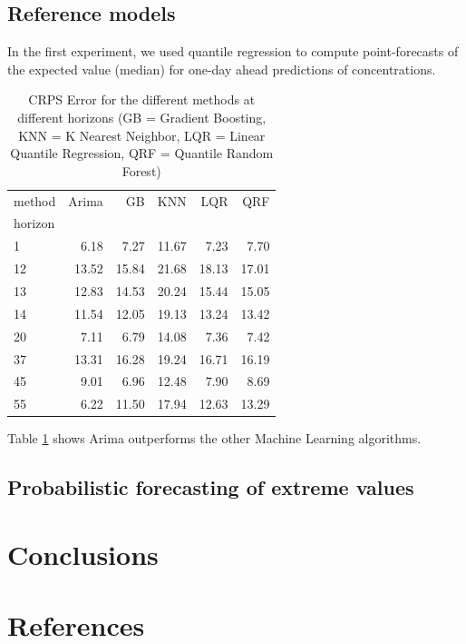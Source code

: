\documentclass[a4paper,twocolumn,5p]{elsarticle}
\begin{document}
\subsection{Reference models}
\label{sec:deterministic}

In the first experiment, we used quantile regression to compute
point-forecasts of the expected value (median) for one-day ahead
predictions of \no concentrations.

\begin{table}[tbp]
  \centering
  \label{tab:determ}
  \caption{CRPS Error for the different methods at different
    horizons (GB = Gradient Boosting,
    KNN = K Nearest Neighbor,
    LQR = Linear Quantile Regression,
    QRF = Quantile Random Forest)
    }
    \begin{tabular}{lrrrrr}
      \toprule
      method &  Arima &    GB &   KNN &   LQR &    QRF \\
      horizon &        &       &       &       &       \\
      \midrule
      1       &   6.18 &  7.27 & 11.67 &  7.23 &  7.70 \\
      12      &  13.52 & 15.84 & 21.68 & 18.13 & 17.01 \\
      13      &  12.83 & 14.53 & 20.24 & 15.44 & 15.05 \\
      14      &  11.54 & 12.05 & 19.13 & 13.24 & 13.42 \\
      20      &   7.11 &  6.79 & 14.08 &  7.36 &  7.42 \\
      37      &  13.31 & 16.28 & 19.24 & 16.71 & 16.19 \\
      45      &   9.01 &  6.96 & 12.48 &  7.90 &  8.69 \\
      55      &   6.22 & 11.50 & 17.94 & 12.63 & 13.29 \\
      \bottomrule
      \end{tabular}
  
\end{table}


Table \ref{tab:determ} shows Arima outperforms the other Machine Learning algorithms.

\subsection{Probabilistic forecasting of extreme values}
\label{sec:probabilistic}

\cite{qxgb}

\section{Conclusions}
\label{sec:concl}

\section*{References}


\end{document}
